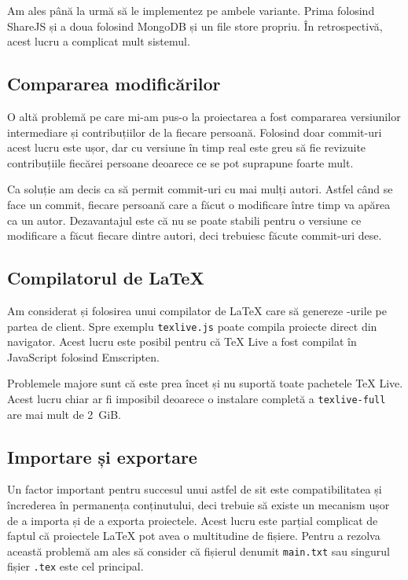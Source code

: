 \documentclass[a4wide,12pt]{report}
\newcommand{\eng}[1]{{#1}} %
\newcommand{\cod}[1]{\texttt{#1}}
\newcommand{\acr}[1]{{\textsmaller[1]{\textsc{#1}}}} %
\begin{document}
Am ales până la urmă să le implementez pe ambele variante. Prima folosind
ShareJS și a doua folosind MongoDB și un \eng{file store} propriu. În
retrospectivă, acest lucru a complicat mult sistemul.

\subsection{Compararea modificărilor}

O altă problemă pe care mi-am pus-o la proiectarea a fost compararea versiunilor
intermediare și contribuțiilor de la fiecare persoană. Folosind doar
\eng{commit}-uri acest lucru este ușor, dar cu versiune în timp real este greu
să fie revizuite contribuțiile fiecărei persoane deoarece ce se pot suprapune
foarte mult.

Ca soluție am decis ca să permit \eng{commit}-uri cu mai mulți autori. Astfel
când se face un \eng{commit}, fiecare persoană care a făcut o modificare între
timp va apărea ca un autor. Dezavantajul este că nu se poate stabili pentru o
versiune ce modificare a făcut fiecare dintre autori, deci trebuiesc făcute
\eng{commit}-uri dese.

\subsection{Compilatorul de \LaTeX}

Am considerat și folosirea unui compilator de \LaTeX{} care să genereze
\acr{PDF}-urile pe partea de client. Spre exemplu \cod{texlive.js}\cite{texlivejs}
poate compila proiecte direct din navigator. Acest lucru este posibil pentru că
\TeX{} Live a fost compilat în JavaScript folosind Emscripten.

Problemele majore sunt că este prea încet și nu suportă toate pachetele \TeX{}
Live. Acest lucru chiar ar fi imposibil deoarece o instalare completă a
\cod{texlive-full} are mai mult de 2~GiB.

\subsection{Importare și exportare}

Un factor important pentru succesul unui astfel de sit este compatibilitatea și
încrederea în permanența conținutului, deci trebuie să existe un mecanism ușor
de a importa și de a exporta proiectele. Acest lucru este parțial complicat de
faptul că proiectele \LaTeX{} pot avea o multitudine de fișiere. Pentru a
rezolva această problemă am ales să consider că fișierul denumit \cod{main.txt}
sau singurul fișier \cod{.tex} este cel principal.
\end{document}
